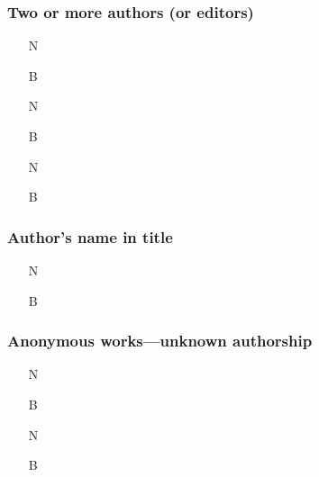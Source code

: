 \documentclass[11pt,letterpaper,oneside]{article}
\begin{document}
\subsubsection{Two or more authors (or editors)}
\label{14.76}

\begin{itemize}
\item[N] 

\item[B] 

\item[N] 

\item[B] 

\item[N] 

\item[B] 
\end{itemize}

\setcounter{subsubsection}{77}
\subsubsection{Author's name in title}
\label{14.78}

\begin{itemize}
\item[N] 

\item[B] 


\end{itemize}

\subsubsection{Anonymous works---unknown authorship}

\begin{itemize}
\item[N] 

\item[B] 

\item[N] 

\item[B] 
\end{itemize}
\end{document}
